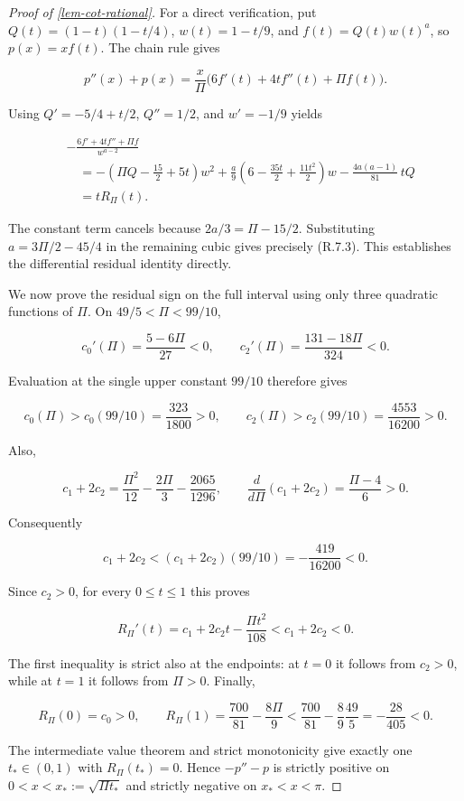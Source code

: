 \documentclass[11pt,a4paper]{article}
\theoremstyle{proofmanuscript}
\begin{document}
\begin{proof}[Proof of \ref{lem-cot-rational}]
For a direct verification, put \(Q(t)=(1-t)(1-t/4)\), \(w(t)=1-t/9\), and \(f(t)=Q(t)w(t)^a\), so \(p(x)=xf(t)\). The chain rule gives

\[
p''(x)+p(x)=\frac{x}{\Pi}\bigl(6f'(t)+4tf''(t)+\Pi f(t)\bigr).
\]

Using \(Q'=-5/4+t/2\), \(Q''=1/2\), and \(w'=-1/9\) yields

\[
\begin{aligned}
&-\frac{6f'+4tf''+\Pi f}{w^{a-2}}\\
&\quad=-\left(\Pi Q-\frac{15}{2}+5t\right)w^2
+\frac a9\left(6-\frac{35t}{2}+\frac{11t^2}{2}\right)w
-\frac{4a(a-1)}{81}\,tQ\\
&\quad=tR_\Pi(t).
\end{aligned}
\]

The constant term cancels because \(2a/3=\Pi-15/2\). Substituting \(a=3\Pi/2-45/4\) in the remaining cubic gives precisely (R.7.3). This establishes the differential residual identity directly.

We now prove the residual sign on the full interval using only three quadratic functions of \(\Pi\). On \(49/5<\Pi<99/10\),

\[
c_0'(\Pi)=\frac{5-6\Pi}{27}<0,\qquad
c_2'(\Pi)=\frac{131-18\Pi}{324}<0.
\]

Evaluation at the single upper constant \(99/10\) therefore gives

\[
c_0(\Pi)>c_0(99/10)=\frac{323}{1800}>0,
\qquad
c_2(\Pi)>c_2(99/10)=\frac{4553}{16200}>0.
\tag{R.7.5}
\]

Also,

\[
c_1+2c_2=\frac{\Pi^2}{12}-\frac{2\Pi}{3}-\frac{2065}{1296},
\qquad
\frac{d}{d\Pi}(c_1+2c_2)=\frac{\Pi-4}{6}>0.
\]

Consequently

\[
c_1+2c_2<(c_1+2c_2)(99/10)
=-\frac{419}{16200}<0.
\tag{R.7.6}
\]

Since \(c_2>0\), for every \(0\le t\le1\) this proves

\[
R_\Pi'(t)=c_1+2c_2t-\frac{\Pi t^2}{108}
<c_1+2c_2<0.
\tag{R.7.7}
\]

The first inequality is strict also at the endpoints: at \(t=0\) it follows from \(c_2>0\), while at \(t=1\) it follows from \(\Pi>0\). Finally,

\[
R_\Pi(0)=c_0>0,
\qquad
R_\Pi(1)=\frac{700}{81}-\frac{8\Pi}{9}
<\frac{700}{81}-\frac89\frac{49}{5}
=-\frac{28}{405}<0.
\tag{R.7.8}
\]

The intermediate value theorem and strict monotonicity give exactly one \(t_*\in(0,1)\) with \(R_\Pi(t_*)=0\). Hence \(-p''-p\) is strictly positive on \(0<x<x_*:=\sqrt{\Pi t_*}\) and strictly negative on \(x_*<x<\pi\).


\end{proof}
\end{document}
